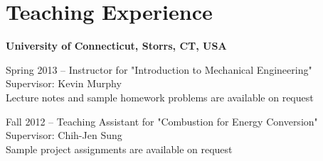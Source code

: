 \section{Teaching Experience}
\textbf{University of Connecticut, Storrs, CT, USA}
\begin{outerlist}
    \item[] Spring 2013 -- Instructor for "Introduction to
            Mechanical Engineering"\\
            Supervisor: Kevin Murphy\\
            Lecture notes and sample homework problems are
            available on request

   \item[] Fall 2012 -- Teaching Assistant for "Combustion for
           Energy Conversion"\\
           Supervisor: Chih-Jen Sung\\
           Sample project assignments are available on request

\end{outerlist}

